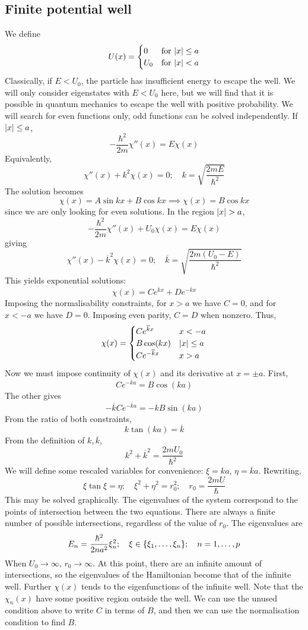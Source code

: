 \subsection{Finite potential well}
We define
\[
	U(x) = \begin{cases}
		0   & \text{for } \abs{x} \leq a \\
		U_0 & \text{for } \abs{x} < a
	\end{cases}
\]
Classically, if \( E < U_0 \), the particle has insufficient energy to escape the well.
We will only consider eigenstates with \( E < U_0 \) here, but we will find that it is possible in quantum mechanics to escape the well with positive probability.
We will search for even functions only, odd functions can be solved independently.
If \( \abs{x} \leq a \),
\[
	-\frac{\hbar^2}{2m} \chi''(x) = E\chi(x)
\]
Equivalently,
\[
	\chi''(x) + k^2 \chi(x) = 0;\quad k = \sqrt{\frac{2mE}{\hbar^2}}
\]
The solution becomes
\[
	\chi(x) = A \sin kx + B \cos kx \implies \chi(x) = B \cos kx
\]
since we are only looking for even solutions.
In the region \( \abs{x} > a \),
\[
	-\frac{\hbar^2}{2m} \chi''(x) + U_0 \chi(x) = E \chi(x)
\]
giving
\[
	\chi''(x) - \overline k^2 \chi(x) = 0;\quad \overline k = \sqrt{\frac{2m(U_0 - E)}{\hbar^2}}
\]
This yields exponential solutions:
\[ \chi(x) = C e^{\overline k x} + D e^{-\overline k x} \]
Imposing the normalisability constraints, for \( x > a \) we have \( C = 0 \), and for \( x < -a \) we have \( D = 0 \).
Imposing even parity, \( C = D \) when nonzero.
Thus,
\[ \chi(x) = \begin{cases}
	C e^{\overline k x} & x < -a \\
	B \cos(kx) & \abs{x} \leq a \\
	C e^{-\overline k x} & x > a
\end{cases} \]
Now we must impose continuity of \( \chi(x) \) and its derivative at \( x = \pm a \).
First,
\[ C e^{-\overline k a} = B \cos(k a) \]
The other gives
\[ -\overline k C e^{-\overline k a} = -k B \sin(k a) \]
From the ratio of both constraints,
\[ k \tan (ka) = \overline k \]
From the definition of \( k, \overline k \),
\[ k^2 + \overline k^2 = \frac{2mU_0}{\hbar^2} \]
We will define some rescaled variables for convenience: \( \xi = ka \), \( \eta = \overline k a \).
Rewriting,
\[ \xi \tan \xi = \eta;\quad \xi^2 + \eta^2 = r_0^2;\quad r_0 = \frac{2mU}{\hbar} \]
This may be solved graphically.
The eigenvalues of the system correspond to the points of intersection between the two equations.
There are always a finite number of possible intersections, regardless of the value of \( r_0 \).
The eigenvalues are
\[ E_n = \frac{\hbar^2}{2 n a^2} \xi_n^2;\quad \xi \in \qty{\xi_1, \dots, \xi_n};\quad n = 1, \dots, p \]
When \( U_0 \to \infty \), \( r_0 \to \infty \).
At this point, there are an infinite amount of intersections, so the eigenvalues of the Hamiltonian become that of the infinite well.
Further \( \chi(x) \) tends to the eigenfunctions of the infinite well.
Note that the \( \chi_n(x) \) have some positive region outside the well.
We can use the unused condition above to write \( C \) in terms of \( B \), and then we can use the normalisation condition to find \( B \).
